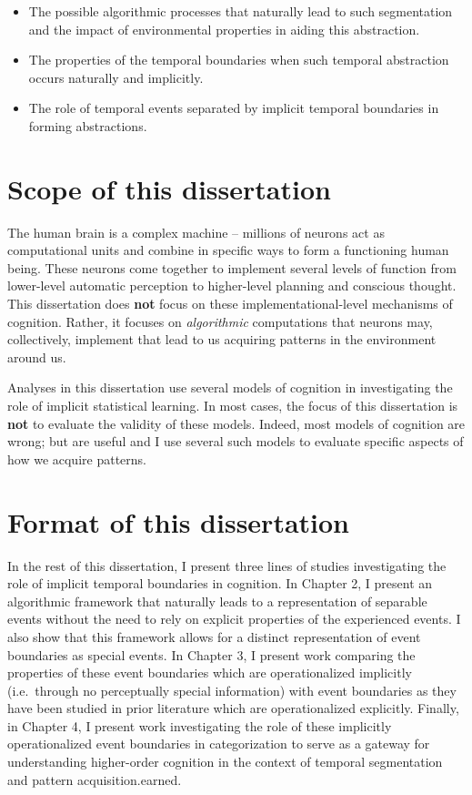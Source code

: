 \begin{itemize}
	\item
	The possible algorithmic processes that naturally lead to such segmentation and the impact of environmental properties in aiding this abstraction.
	\item
	The properties of the temporal boundaries when such temporal abstraction occurs naturally and implicitly.
	\item
	The role of temporal events separated by implicit temporal boundaries in forming abstractions.
\end{itemize}

\section{Scope of this dissertation}\label{scope-of-this-dissertation}

The human brain is a complex machine -- millions of neurons act as computational units and combine in specific ways to form a functioning human being. These neurons come together to implement several levels of function from lower-level automatic perception to higher-level planning and conscious thought. This dissertation does \textbf{not} focus on these implementational-level mechanisms of cognition. Rather, it focuses on \emph{algorithmic} computations that neurons may, collectively, implement that lead to us acquiring patterns in the environment around us.

Analyses in this dissertation use several models of cognition in investigating the role of implicit statistical learning. In most cases, the focus of this dissertation is \textbf{not} to evaluate the validity of these models. Indeed, most models of cognition are wrong; but are useful and I use several such models to evaluate specific aspects of how we acquire patterns. 

\section{Format of this dissertation}\label{format-of-this-dissertation}

In the rest of this dissertation, I present three lines of studies investigating the role of implicit temporal boundaries in cognition. In Chapter 2, I present an algorithmic framework that naturally leads to a representation of separable events without the need to rely on explicit properties of the experienced events. I also show that this framework allows for a distinct representation of event boundaries as special events. In Chapter 3, I present work comparing the properties of these event boundaries which are operationalized implicitly (i.e.~through no perceptually special information) with event boundaries as they have been studied in prior literature which are operationalized explicitly. Finally, in Chapter 4, I present work investigating the role of these implicitly operationalized event boundaries in categorization to serve as a gateway for understanding higher-order cognition in the context of temporal segmentation and pattern acquisition.earned.
